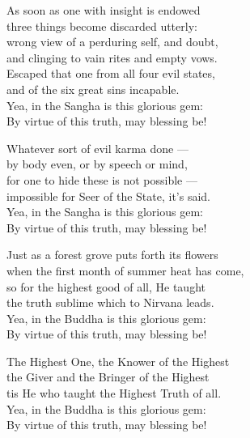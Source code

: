 \begin{MyDescription}{}
As soon as one with insight is endowed\\
three things become discarded utterly:\\
wrong view of a perduring self, and doubt,\\
and clinging to vain rites and empty vows.\\
Escaped that one from all four evil states,\\
and of the six great sins incapable.\\
Yea, in the Sangha is this glorious gem:\\
By virtue of this truth, may blessing be!
\end{MyDescription}

\begin{MyDescription}{}
Whatever sort of evil karma done —\\
by body even, or by speech or mind,\\
for one to hide these is not possible —\\
impossible for Seer of the State, it's said.\\
Yea, in the Sangha is this glorious gem:\\
By virtue of this truth, may blessing be!
\end{MyDescription}

\begin{MyDescription}{}
Just as a forest grove puts forth its ﬂowers\\
when the ﬁrst month of summer heat has come,\\
so for the highest good of all, He taught\\
the truth sublime which to Nirvana leads.\\
Yea, in the Buddha is this glorious gem:\\
By virtue of this truth, may blessing be!
\end{MyDescription}

\begin{MyDescription}{}
The Highest One, the Knower of the Highest\\
the Giver and the Bringer of the Highest\\
tis He who taught the Highest Truth of all.\\
Yea, in the Buddha is this glorious gem:\\
By virtue of this truth, may blessing be!
\end{MyDescription}

